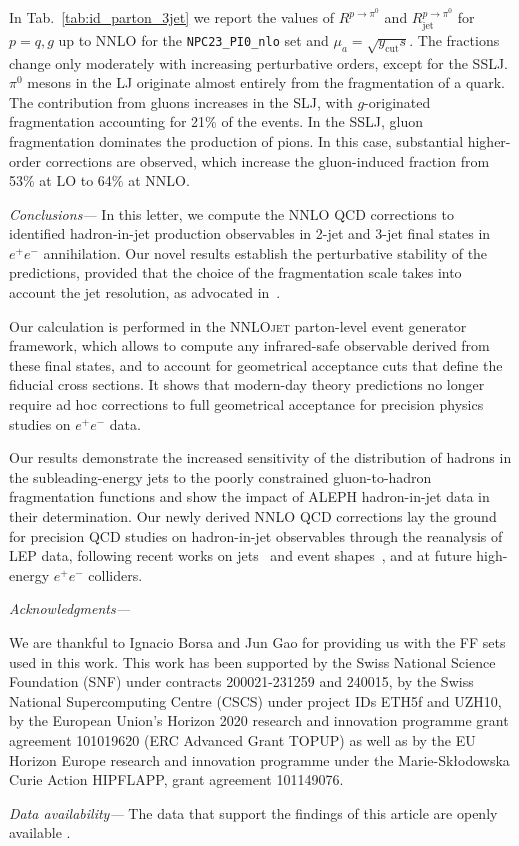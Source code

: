 \documentclass[10pt,aps,prl,twocolumn,preprintnumbers,nofootinbib]{revtex4-2}
\newcommand{\code}[1]{\texttt{#1}}
\newcommand{\NNLOJET}{\textsc{NNLOjet}\xspace}
\newcommand{\ycut}{y_\mathrm{cut}}
\newcommand{\jet}{\mathrm{jet}}
\newcommand{\NPCnlo}{\code{NPC23\_PI0\_nlo}\xspace}
\begin{document}


In Tab.~\ref{tab:id_parton_3jet} we report the values of $R^{p \to \pi^0}$ and $R_{\jet}^{p \to \pi^0}$ for $p=q,g$ up to NNLO for the \NPCnlo set and $\mu_a=\sqrt{\ycut s}$.
The fractions change only moderately with increasing perturbative orders, except for the SSLJ.
$\pi^0$ mesons in the LJ originate almost entirely from the fragmentation of a quark.
The contribution from gluons increases in the SLJ, with $g$-originated fragmentation accounting for 21\% of the events.
In the SSLJ, gluon fragmentation dominates the production of pions.
In this case, substantial higher-order corrections are observed, which increase the gluon-induced fraction from 53\% at LO to 64\% at NNLO.
\newline

\textit{Conclusions---}\ignorespaces
In this letter, we compute the NNLO QCD corrections to identified hadron-in-jet production observables in 2-jet and 3-jet final states in $e^+e^-$ annihilation.
Our novel results establish the perturbative stability of the predictions, provided that the choice of the fragmentation scale takes into account the jet resolution, as advocated in~\cite{Dokshitzer:1987nm,Dokshitzer:1991wu,Procura:2009vm,Jain:2011xz,Kaufmann:2015hma}.

Our calculation is performed in the \NNLOJET parton-level event generator framework, which allows to compute any infrared-safe observable derived from these final states, and to account for geometrical acceptance cuts that define the fiducial cross sections.
It shows that modern-day theory predictions no longer require ad hoc corrections to full geometrical acceptance for precision physics studies on $e^+e^-$ data.

Our results demonstrate the increased sensitivity of the distribution of hadrons in the subleading-energy jets to the poorly constrained gluon-to-hadron fragmentation functions and show the impact of ALEPH hadron-in-jet data in their determination.
Our newly derived NNLO QCD corrections lay the ground for precision QCD studies on hadron-in-jet observables through the reanalysis of LEP data, following recent works on jets~\cite{Electron-PositronAlliance:2021kig} and event shapes~\cite{Electron-PositronAlliance:2025hze}, and at future high-energy $e^+e^-$ colliders.
\newline



\textit{Acknowledgments---}\ignorespaces

We are thankful to Ignacio Borsa and Jun Gao for providing us with the FF sets used in this work.
This work has been supported by the Swiss National Science Foundation (SNF) under contracts 200021-231259 and 240015, by the Swiss National Supercomputing Centre (CSCS) under project IDs ETH5f and UZH10, by the European Union's Horizon 2020 research and innovation programme grant agreement 101019620 (ERC Advanced Grant TOPUP) as well as by the EU Horizon Europe research and innovation programme under the Marie-Sk\l{}odowska Curie Action HIPFLAPP, grant agreement 101149076.

\textit{Data availability---}\ignorespaces
The data that support the findings of this article are openly available \cite{bonino_2026_18683133}.



\end{document}

